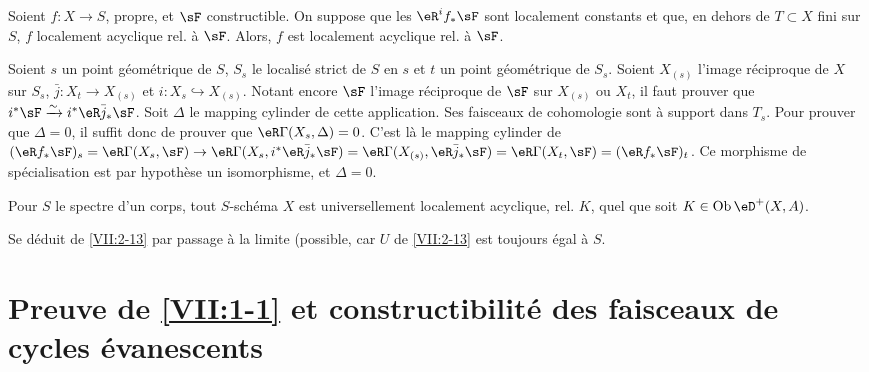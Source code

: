 \begin{lemma_}\label{VII:2-15}
Soient $f:X\to S$, propre, et $\sF$ constructible. On suppose que les 
$\eR^i f_\ast \sF$ sont localement constants et que, en dehors de $T\subset X$ 
fini sur $S$, $f$ localement acyclique rel. \`a $\sF$. Alors, $f$ est 
localement acyclique rel. \`a $\sF$. 
\end{lemma_}

Soient $s$ un point g\'eom\'etrique de $S$, $S_s$ le localis\'e strict de $S$ 
en $s$ et $t$ un point g\'eom\'etrique de $S_s$. Soient $X_{(s)}$ l'image 
r\'eciproque de $X$ sur $S_s$, $\bar j:X_t \to X_{(s)}$ et 
$i:X_s \hookrightarrow X_{(s)}$. Notant encore $\sF$ l'image r\'eciproque de 
$\sF$ sur $X_{(s)}$ ou $X_t$, il faut prouver que 
$i^\ast \sF \iso i^\ast \eR \bar j_\ast \sF$. Soit $\Delta$ le mapping cylinder 
de cette application. Ses faisceaux de cohomologie sont \`a support dans $T_s$. 
Pour prouver que $\Delta=0$, il suffit donc de prouver que 
$\eR\Gamma(X_s,\Delta)=0$. C'est l\`a le mapping cylinder de 
$(\eR f_\ast \sF)_s = \eR\Gamma(X_s,\sF) \to \eR\Gamma(X_s,i^\ast \eR\bar j_\ast \sF) = \eR\Gamma(X_{(s)},\eR\bar j_\ast \sF) = \eR\Gamma(X_t,\sF) = (\eR f_\ast \sF)_t$. 
Ce morphisme de sp\'ecialisation est par hypoth\`ese un isomorphisme, et 
$\Delta=0$. 





\begin{corollary_}\label{VII:2-16}
Pour $S$ le spectre d'un corps, tout $S$-sch\'ema $X$ est universellement 
localement acyclique, rel. $K$, quel que soit $K\in\ob\eD^+(X,A)$. 
\end{corollary_}

Se d\'eduit de \ref{VII:2-13} par passage \`a la limite (possible, car $U$ de 
\ref{VII:2-13} est toujours \'egal \`a $S$. 










\section{Preuve de \texorpdfstring{\ref{VII:1-1}}{1.1} et constructibilit\'e des faisceaux de cycles \'evanescents}\label{VII:3}





\subsection{}\label{VII:3-1}

